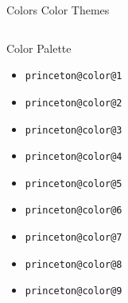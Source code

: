 \documentclass[aspectratio=169]{beamer}
\begin{document}
\begin{frame}[t,fragile]{Colors }{Color Themes}
\begin{columns}[T]
  \begin{column}{.33\textwidth}
    \begin{block}{Color Palette}
        \begin{itemize}
        \item \textcolor{princeton@color@1}{\texttt{princeton@color@1}}
        \item \textcolor{princeton@color@2}{\texttt{princeton@color@2}}
        \item \textcolor{princeton@color@3}{\texttt{princeton@color@3}}
        \item \textcolor{princeton@color@4}{\texttt{princeton@color@4}}
        \item \textcolor{princeton@color@5}{\texttt{princeton@color@5}}
        \item \textcolor{princeton@color@6}{\texttt{princeton@color@6}}
        \item \textcolor{princeton@color@7}{\texttt{princeton@color@7}}
        \item \textcolor{princeton@color@8}{\texttt{princeton@color@8}}
        \item \textcolor{princeton@color@9}{\texttt{princeton@color@9}}
        \end{itemize}
      \end{block}
    \end{column}
  \end{columns}

\end{frame}
\end{document}
